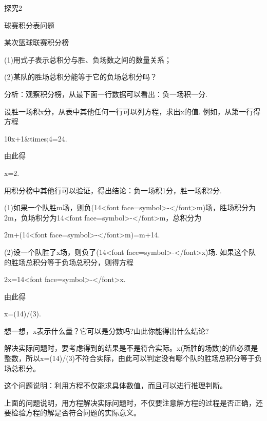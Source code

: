 探究2\newline

球赛积分表问题\newline

某次篮球联赛积分榜\newline

(1)用式子表示总积分与胜、负场数之间的数量关系；\newline

(2)某队的胜场总积分能等于它的负场总积分吗？\newline

分析：观察积分榜，从最下面一行数据可以看出：负一场积一分. \newline

设胜一场积x分，从表中其他任何一行可以列方程，求出x的值. 例如，从第一行得方程\newline

10x+1&times;4=24.\newline

由此得\newline

x=2.\newline

用积分榜中其他行可以验证，得出结论：负一场积1分，胜一场积2分.\newline

(1)如果一个队胜m场，则负(14<font face=symbol>-</font>m)场，胜场积分为2m，负场积分为14<font face=symbol>-</font>m，总积分为\newline

2m+(14<font face=symbol>-</font>m)=m+14. \newline

(2)设一个队胜了x场，则负了(14<font face=symbol>-</font>x)场. 如果这个队的胜场总积分等于负场总积分，则得方程\newline

2x=14<font face=symbol>-</font>x. \newline

由此得\newline

x=(14)/(3). \newline

想一想，x表示什么量？它可以是分数吗?山此你能得出什么结论?

解决实际问题时，要考虑得到的结果是不是符合实际。x(所胜的场数)的值必须是整数，所以x=(14)/(3)不符合实际，由此可以判定没有哪个队的胜场总积分等于负场总积分。

这个问题说明：利用方程不仅能求具体数值，而且可以进行推理判断。

上面的问题说明，用方程解决实际问题时，不仅要注意解方程的过程是否正确，还要检验方程的解是否符合问题的实际意义。



